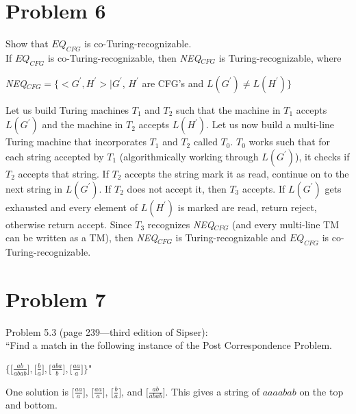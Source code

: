 \documentclass[11pt]{article}
\begin{document}
\section*{Problem 6}

    Show that $EQ_{CFG}$ is co-Turing-recognizable.\\
    
    If $EQ_{CFG}$ is co-Turing-recognizable, then {\em NEQ}$_{CFG}$ is Turing-recognizable, where
    \begin{center}
        {\em NEQ}$_{CFG} = \{ <G^\prime, H^\prime>| G^\prime$, $H^\prime$ are CFG's and $L(G^\prime) \neq L(H^\prime)\}$ 
    \end{center}
    Let us build Turing machines $T_1$ and $T_2$ such that the machine in $T_1$ accepts $L(G^\prime)$ and the machine in $T_2$ accepts $L(H^\prime)$. Let us now build a multi-line Turing machine that incorporates $T_1$ and $T_2$ called $T_0$. $T_0$ works such that for each string accepted by $T_1$ (algorithmically working through $L(G^\prime)$), it checks if $T_2$ accepts that string. If $T_2$ accepts the string mark it as read, continue on to the next string in $L(G^\prime)$. If $T_2$ does not accept it, then $T_3$ accepts. If $L(G^\prime)$ gets exhausted and every element of $L(H^\prime)$ is marked are read, return reject, otherwise return accept. Since $T_3$ recognizes {\em NEQ}$_{CFG}$ (and every multi-line TM can be written as a TM), then {\em NEQ}$_{CFG}$ is Turing-recognizable and $EQ_{CFG}$ is co-Turing-recognizable.
    
\newpage





\section*{Problem 7}

    Problem 5.3 (page 239---third edition of Sipser):\\
    
    ``Find a match in the following instance of the Post Correspondence Problem.
    \begin{center}
        $\Big\{ \Big[\frac{ab}{abab}\Big], \Big[\frac{b}{a}\Big], \Big[\frac{aba}{b}\Big], \big[\frac{aa}{a}\big]\Big\}$"
    \end{center}
    
    
    One solution is $\Big[ \frac{aa}{a}\Big]$, $\Big[ \frac{aa}{a}\Big]$, $\Big[ \frac{b}{a}\Big]$, and $\Big[ \frac{ab}{abab}\Big]$. This gives a string of $aaaabab$ on the top and bottom. 
    

\newpage

\end{document}
